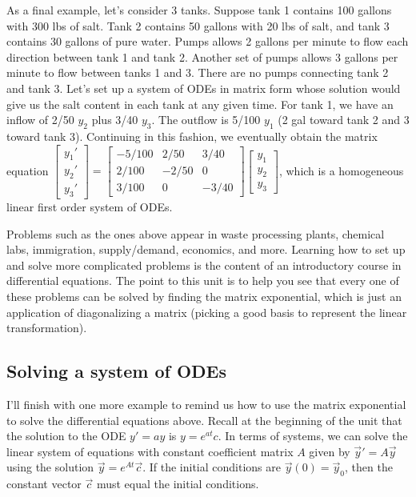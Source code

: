 As a final example, let's consider 3 tanks.  Suppose tank 1 contains 100 gallons with 300 lbs of salt.  Tank 2 contains 50 gallons with 20 lbs of salt, and tank 3 contains 30 gallons of pure water.  Pumps allows 2 gallons per minute to flow each direction between tank 1 and tank 2.  Another set of pumps allows 3 gallons per minute to flow between tanks 1 and 3.  There are no pumps connecting tank 2 and tank 3. Let's set up a system of ODEs in matrix form whose solution would give us the salt content in each tank at any given time.  For tank 1, we have an inflow of 2/50 $y_2$ plus 3/40 $y_3$. The outflow is 5/100 $y_1$ (2 gal toward tank 2 and 3 toward tank 3).  Continuing in this fashion, we eventually obtain the matrix equation
$
\begin{bmatrix}
y_1'\\
y_2'\\
y_3'
\end{bmatrix}
=
\begin{bmatrix}
-5/100&2/50 &3/40\\
2/100 &-2/50&0\\
3/100 &0    &-3/40
\end{bmatrix}
\begin{bmatrix}
y_1\\
y_2\\
y_3
\end{bmatrix}
$, which is a homogeneous linear first order system of ODEs.

Problems such as the ones above appear in waste processing plants, chemical labs, immigration, supply/demand, economics, and more. Learning how to set up and solve more complicated problems is the content of an introductory course in differential equations.  The point to this unit is to help you see that every one of these problems can be solved by finding the matrix exponential, which is just an application of diagonalizing a matrix (picking a good basis to represent the linear transformation).


\subsection{Solving a system of ODEs}
I'll finish with one more example to remind us how to use the matrix exponential to solve the differential equations above.  Recall at the beginning of the unit that the solution to the ODE 
 $y' =a y$ is $y=e^{at}c$. In terms of systems, we can solve the linear system of equations with constant coefficient matrix $A$ given by $\vec y' =A \vec y$ using the solution
$\vec y=e^{At}\vec c.$ If the initial conditions are $\vec y(0)=\vec y_0$, then the constant vector $\vec c$ must equal the initial conditions.

